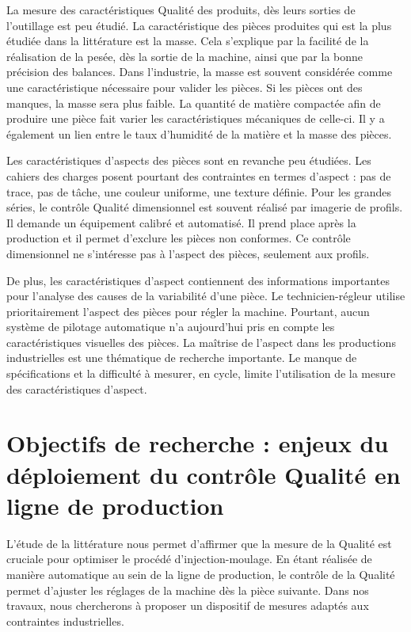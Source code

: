 La mesure des caractéristiques Qualité des produits, dès leurs sorties de l'outillage est peu étudié.
La caractéristique des pièces produites qui est la plus étudiée dans la littérature est la masse.
Cela s'explique par la facilité de la réalisation de la pesée, dès la sortie de la machine, ainsi que par la bonne précision des balances.
Dans l'industrie, la masse est souvent considérée comme une caractéristique nécessaire pour valider les pièces.
Si les pièces ont des manques, la masse sera plus faible.
La quantité de matière compactée afin de produire une pièce fait varier les caractéristiques mécaniques de celle-ci.
Il y a également un lien entre le taux d'humidité de la matière et la masse des pièces.

Les caractéristiques d'aspects des pièces sont en revanche peu étudiées.
Les cahiers des charges posent pourtant des contraintes en termes d'aspect : pas de trace, pas de tâche, une couleur uniforme, une texture définie.
Pour les grandes séries, le contrôle Qualité dimensionnel est souvent réalisé par imagerie de profils.
Il demande un équipement calibré et automatisé.
Il prend place après la production et il permet d'exclure les pièces non conformes.
Ce contrôle dimensionnel ne s'intéresse pas à l'aspect des pièces, seulement aux profils.

De plus, les caractéristiques d'aspect contiennent des informations importantes pour l'analyse des causes de la variabilité d'une pièce. %
Le technicien-régleur utilise prioritairement l'aspect des pièces pour régler la machine.
Pourtant, aucun système de pilotage automatique n'a aujourd'hui pris en compte les caractéristiques visuelles des pièces.
La maîtrise de l'aspect dans les productions industrielles est une thématique de recherche importante. %
Le manque de spécifications et la difficulté à mesurer, en cycle, limite l'utilisation de la mesure des caractéristiques d'aspect.

\section{Objectifs de recherche : enjeux du déploiement du contrôle Qualité en ligne de production}
L'étude de la littérature nous permet d'affirmer que la mesure de la Qualité est cruciale pour optimiser le procédé d'injection-moulage.
En étant réalisée de manière automatique au sein de la ligne de production, le contrôle de la Qualité permet d'ajuster les réglages de la machine dès la pièce suivante.
Dans nos travaux, nous chercherons à proposer un dispositif de mesures adaptés aux contraintes industrielles.

